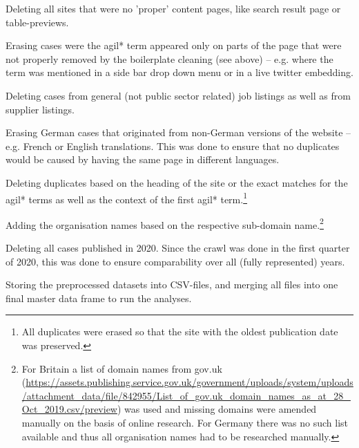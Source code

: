 \begin{compactitem}
\begin{compactitem}
    \item Deleting all sites that were no 'proper' content pages, like search result page or table-previews.
    \item Erasing cases were the agil* term appeared only on parts of the page that were not properly removed by the boilerplate cleaning (see above) – e.g. where the term was mentioned in a side bar drop down menu or in a live twitter embedding.
    \item Deleting cases from general (not public sector related) job listings as well as from supplier listings.
    \end{compactitem}
\item Erasing German cases that originated from non-German versions of the website – e.g. French or English translations. This was done to ensure that no duplicates would be caused by having the same page in different languages.
\item Deleting duplicates based on the heading of the site or the exact matches for the agil* terms as well as the context of the first agil* term.\footnote{All duplicates were erased so that the site with the oldest publication date was preserved.}
\item Adding the organisation names based on the respective sub-domain name.\footnote{For Britain a list of domain names from gov.uk (\url{https://assets.publishing.service.gov.uk/government/uploads/system/uploads/attachment_data/file/842955/List_of_gov.uk_domain_names_as_at_28_Oct_2019.csv/preview}) was used and missing domains were amended manually on the basis of online research. For Germany there was no such list available and thus all organisation names had to be researched manually.} 
\item Deleting all cases published in 2020. Since the crawl was done in the first quarter of 2020, this was done to ensure comparability over all (fully represented) years.
\item Storing the preprocessed datasets into CSV-files, and merging all files into one final master data frame to run the analyses. 
\end{compactitem}

